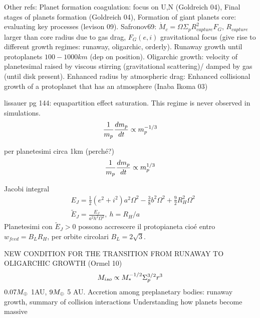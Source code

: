 \begin{workout}
Other refs: Planet formation coagulation: focus on U,N (Goldreich 04), Final stages of planets formation (Goldreich 04), Formation of giant planets core: evaluating key processes (levison 09).
Safronov69: $\dot{M}_c=\Omega\Sigma_pR^2_{capture}F_G$, $R_{capture}$ larger than core radius due to gas drag, $F_G(e,i)$ gravitational focus (give rise to different growth regimes: runaway, oligarchic, orderly).
Runaway growth until protoplanets $100-1000km$ (dep on position).
Oligarchic growth: velocity of planetesimal raised by viscous stirring (gravitational scattering)/ damped by gas (until disk present).
Enhanced radius by atmospheric drag: Enhanced collisional growth of a protoplanet that has an atmosphere (Inaba Ikoma 03)
\end{workout}

\begin{workout}
lissauer pg 144: equapartition effect saturation. This regime is never observed in simulations.
\begin{equation}
\frac{1}{m_p}\TDy{t}{m_p}\propto m_p\expy{-1/3}
\end{equation}
\end{workout}

\begin{workout}
per planetesimi circa 1km (perch\'e?)
\begin{equation}
\frac{1}{m_p}\TDy{t}{m_p}\propto m_p\expy{1/3}
\end{equation}
\end{workout}

\begin{workout}
Jacobi integral
\begin{align}
&E_J=\frac{1}{2}(e^2+i^2)a^2\Omega^2-\frac{3}{8}b^2\Omega^2+\frac{9}{2}R_H^2\Omega^2\\
&\tilde{E}_J=\frac{E_J}{a^2h^2\Omega^2},\ h=R_H/a
\end{align}
Planetesimi con $\tilde{E}_J>0$ possono accrescere il protopianeta  cio\'e entro $w_{feed}=B_LR_H$, per orbite circolari $B_L=2\sqrt{3 }$.
\end{workout}

\begin{workout}
 NEW CONDITION FOR THE TRANSITION FROM RUNAWAY TO OLIGARCHIC GROWTH (Ormel 10)
 \begin{equation}
M_{iso}\propto M_*\expy{-1/2}\Sigma_p\expy{3/2}r^3
\end{equation}
$0.07\mearth{}$ 1AU, $9\mearth{}$ 5 AU.
Accretion among preplanetary bodies: runaway growth, summary of collision interactions
Understanding how planets become massive
\end{workout}
  
